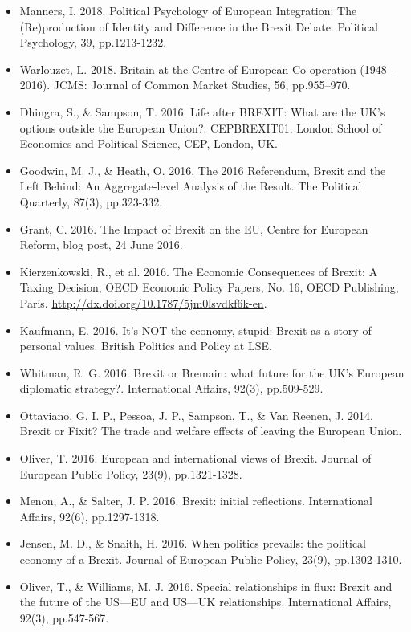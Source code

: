 \begin{itemize}
	\item Manners, I. 2018. Political Psychology of European Integration: The (Re)production of Identity and Difference in the Brexit Debate. Political Psychology, 39, pp.1213-1232.
	\item Warlouzet, L. 2018. Britain at the Centre of European Co-operation (1948–2016). JCMS: Journal of Common Market Studies, 56, pp.955–970.
	\item Dhingra, S., \& Sampson, T. 2016. Life after BREXIT: What are the UK’s options outside the European Union?. CEPBREXIT01. London School of Economics and Political Science, CEP, London, UK.
	\item Goodwin, M. J., \& Heath, O. 2016. The 2016 Referendum, Brexit and the Left Behind: An Aggregate-level Analysis of the Result. The Political Quarterly, 87(3), pp.323-332.
	\item Grant, C. 2016. The Impact of Brexit on the EU, Centre for European Reform, blog post, 24 June 2016. 
	\item Kierzenkowski, R., et al. 2016. The Economic Consequences of Brexit: A Taxing Decision, OECD Economic Policy Papers, No. 16, OECD Publishing, Paris.
	\url{http://dx.doi.org/10.1787/5jm0lsvdkf6k-en}.
	\item Kaufmann, E. 2016. It’s NOT the economy, stupid: Brexit as a story of personal values. British Politics and Policy at LSE.
	\item Whitman, R. G. 2016. Brexit or Bremain: what future for the UK's European diplomatic strategy?. International Affairs, 92(3), pp.509-529.
	\item Ottaviano, G. I. P., Pessoa, J. P., Sampson, T., \& Van Reenen, J. 2014. Brexit or Fixit? The trade and welfare effects of leaving the European Union.
	\item Oliver, T. 2016. European and international views of Brexit. Journal of European Public Policy, 23(9), pp.1321-1328.
	\item Menon, A., \& Salter, J. P. 2016. Brexit: initial reflections. International Affairs, 92(6), pp.1297-1318.
	\item Jensen, M. D., \& Snaith, H. 2016. When politics prevails: the political economy of a Brexit. Journal of European Public Policy, 23(9), pp.1302-1310.
	\item Oliver, T., \& Williams, M. J. 2016. Special relationships in flux: Brexit and the future of the US—EU and US—UK relationships. International Affairs, 92(3), pp.547-567.
\end{itemize}